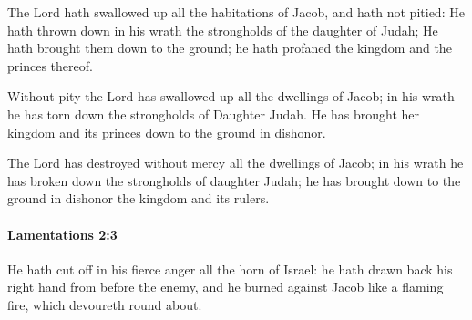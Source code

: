 			\begin{versebox}
					\item[BHS] 
					\item[LXX] 
					\item[ASV] The Lord hath swallowed up all the habitations of Jacob, and hath not pitied: He hath thrown down in his wrath the strongholds of the daughter of Judah; He hath brought them down to the ground; he hath profaned the kingdom and the princes thereof.
					\item[NIV] Without pity the Lord has swallowed up all the dwellings of Jacob; in his wrath he has torn down the strongholds of Daughter Judah. He has brought her kingdom and its princes down to the ground in dishonor.
					\item[NRSV] The Lord has destroyed without mercy all the dwellings of Jacob; in his wrath he has broken down the strongholds of daughter Judah; he has brought down to the ground in dishonor the kingdom and its rulers.
			\end{versebox}

		\paragraph{Lamentations 2:3} %
			\label{LAMENTATIONS-2-3}

			He hath cut off in his fierce anger all the horn of Israel: he hath drawn back his right hand from before the enemy, and he burned against Jacob like a flaming fire, which devoureth round about.


